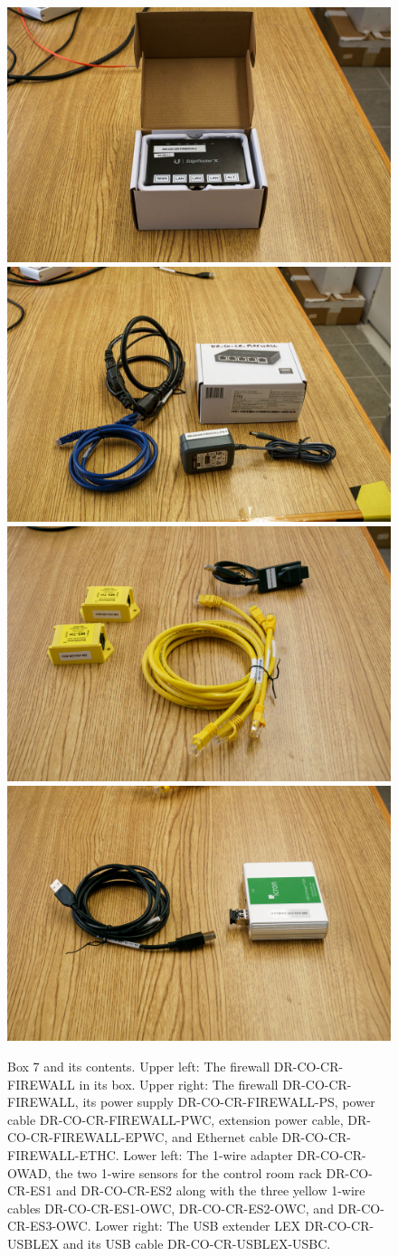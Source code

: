 \documentclass{article}
\begin{document}
\begin{figure}[bp]
\begin{center}
\includegraphics[width=0.45\linewidth]{figures/20201207T170111.jpg} 
\includegraphics[width=0.45\linewidth]{figures/20201207T170134.jpg}\\[\smallskipamount]
\includegraphics[width=0.45\linewidth]{figures/20201207T171428.jpg} 
\includegraphics[width=0.45\linewidth]{figures/20201207T171439.jpg}\\[\smallskipamount]
\end{center}
\caption{Box 7 and its contents. Upper left: The firewall DR-CO-CR-FIREWALL in its box. Upper right: The firewall DR-CO-CR-FIREWALL, its power supply DR-CO-CR-FIREWALL-PS, power cable DR-CO-CR-FIREWALL-PWC, extension power cable,
DR-CO-CR-FIREWALL-EPWC, and Ethernet cable
DR-CO-CR-FIREWALL-ETHC. Lower left:  The 1-wire adapter DR-CO-CR-OWAD, 
the two 1-wire sensors for the control room rack 
DR-CO-CR-ES1 and
DR-CO-CR-ES2
along with the three yellow 1-wire cables 
DR-CO-CR-ES1-OWC,
DR-CO-CR-ES2-OWC, and
DR-CO-CR-ES3-OWC. Lower right:  The USB extender LEX 
DR-CO-CR-USBLEX and its USB cable
DR-CO-CR-USBLEX-USBC.}
\label{figure:box-seven-a}
\end{figure}
\end{document}
